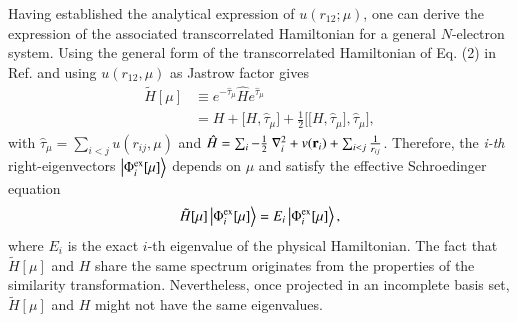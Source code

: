 \documentclass[aip,jcp,reprint,noshowkeys,superscriptaddress,twocolumn]{revtex4-1}
\newcommand{\br}[0]{{\bf {r}}}
\newcommand{\phimui}[0]{\Phi^{\text{ex}}_i[\mu]}
\begin{document}
Having established the analytical expression of $u(r_{12};\mu)$, one can derive the expression of the associated transcorrelated Hamiltonian for a general $N$-electron system.  
Using the general form of the transcorrelated Hamiltonian of Eq. (2) in Ref.  and using $u(r_{12},\mu)$ as Jastrow factor gives 
\begin{equation}
 \begin{aligned}
 \label{ht_def_g}
 \tilde{H}[\mu] &\equiv e^{-\hat{\tau}_\mu} \hat{H} e^{\hat{\tau}_\mu} \\ 
                &= H + \big[ H,\hat{\tau}_\mu \big] + \frac{1}{2}\bigg[ \big[H,\hat{\tau}_\mu\big],\hat{\tau}_\mu\bigg],
 \end{aligned}
\end{equation}
with $\hat{\tau}_\mu = \sum_{i<j}u(r_{ij},\mu)$ and $\hat{H} = \sum_i -\frac{1}{2} \nabla^2_i + v(\br{}_i) + \sum_{i<j} \frac{1}{r_{ij}}$. 
Therefore, the \textit{i-th} right-eigenvectors $\ket{\phimui}$ depends on $\mu$ and satisfy the effective Schroedinger equation
\begin{equation}
 \tilde{H}[\mu] \ket{ \phimui}  = E_i \ket{\phimui}, 
\end{equation}
where $E_i$ is the exact $i$-th eigenvalue of the physical Hamiltonian. The fact that $\tilde{H}[\mu]$ and $H$ share the same spectrum originates from the properties of the similarity transformation. Nevertheless, once projected in an incomplete basis set, $\tilde{H}[\mu]$ and $H$ might not have the same eigenvalues. 
\end{document}
